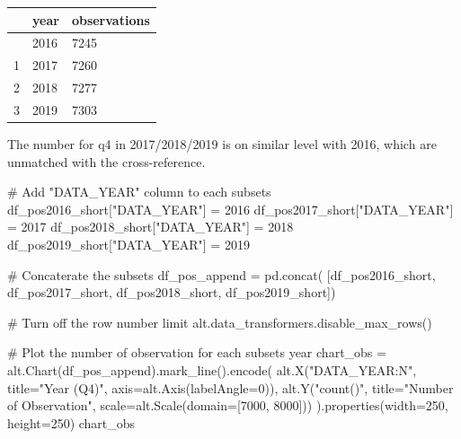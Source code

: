 \documentclass[
  letterpaper,
  DIV=11,
  numbers=noendperiod]{scrartcl}
\newenvironment{Shaded}{\begin{snugshade}}{\end{snugshade}}
\newcommand{\CommentTok}[1]{\textcolor[rgb]{0.37,0.37,0.37}{#1}}
\newcommand{\DecValTok}[1]{\textcolor[rgb]{0.68,0.00,0.00}{#1}}
\newcommand{\NormalTok}[1]{\textcolor[rgb]{0.00,0.23,0.31}{#1}}
\newcommand{\OperatorTok}[1]{\textcolor[rgb]{0.37,0.37,0.37}{#1}}
\newcommand{\StringTok}[1]{\textcolor[rgb]{0.13,0.47,0.30}{#1}}
\begin{document}
\begin{longtable}[]{@{}lll@{}}
\toprule\noalign{}
& year & observations \\
\midrule\noalign{}
\endhead
\bottomrule\noalign{}
\endlastfoot
0 & 2016 & 7245 \\
1 & 2017 & 7260 \\
2 & 2018 & 7277 \\
3 & 2019 & 7303 \\
\end{longtable}

The number for q4 in 2017/2018/2019 is on similar level with 2016, which
are unmatched with the cross-reference.

\begin{Shaded}
\begin{Highlighting}[]
\CommentTok{\# Add "DATA\_YEAR" column to each subsets}
\NormalTok{df\_pos2016\_short[}\StringTok{"DATA\_YEAR"}\NormalTok{] }\OperatorTok{=} \DecValTok{2016}
\NormalTok{df\_pos2017\_short[}\StringTok{"DATA\_YEAR"}\NormalTok{] }\OperatorTok{=} \DecValTok{2017}
\NormalTok{df\_pos2018\_short[}\StringTok{"DATA\_YEAR"}\NormalTok{] }\OperatorTok{=} \DecValTok{2018}
\NormalTok{df\_pos2019\_short[}\StringTok{"DATA\_YEAR"}\NormalTok{] }\OperatorTok{=} \DecValTok{2019}

\CommentTok{\# Concaterate the subsets}
\NormalTok{df\_pos\_append }\OperatorTok{=}\NormalTok{ pd.concat(}
\NormalTok{    [df\_pos2016\_short, df\_pos2017\_short, df\_pos2018\_short, df\_pos2019\_short])}

\CommentTok{\# Turn off the row number limit}
\NormalTok{alt.data\_transformers.disable\_max\_rows()}

\CommentTok{\# Plot the number of observation for each subset\textquotesingle{}s year}
\NormalTok{chart\_obs }\OperatorTok{=}\NormalTok{ alt.Chart(df\_pos\_append).mark\_line().encode(}
\NormalTok{    alt.X(}\StringTok{"DATA\_YEAR:N"}\NormalTok{, title}\OperatorTok{=}\StringTok{"Year (Q4)"}\NormalTok{, axis}\OperatorTok{=}\NormalTok{alt.Axis(labelAngle}\OperatorTok{=}\DecValTok{0}\NormalTok{)),}
\NormalTok{    alt.Y(}\StringTok{"count()"}\NormalTok{, title}\OperatorTok{=}\StringTok{"Number of Observation"}\NormalTok{,}
\NormalTok{          scale}\OperatorTok{=}\NormalTok{alt.Scale(domain}\OperatorTok{=}\NormalTok{[}\DecValTok{7000}\NormalTok{, }\DecValTok{8000}\NormalTok{]))}
\NormalTok{).properties(width}\OperatorTok{=}\DecValTok{250}\NormalTok{, height}\OperatorTok{=}\DecValTok{250}\NormalTok{)}
\NormalTok{chart\_obs}
\end{Highlighting}
\end{Shaded}
\end{document}
